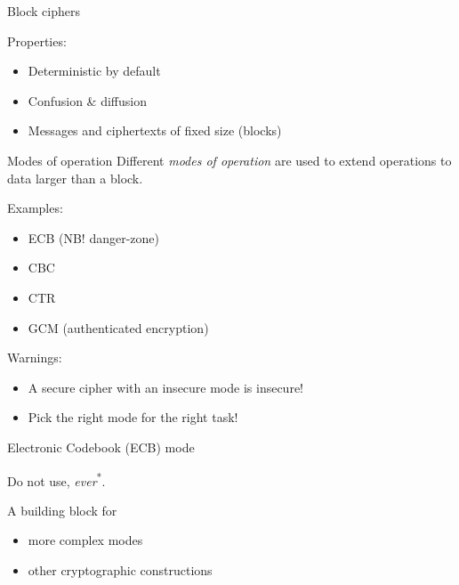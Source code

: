 \begin{frame}{Block ciphers}
\begin{center}
  \end{center}

  \pause
  Properties:
  \begin{itemize}[<+->]
    \item Deterministic by default
    \item Confusion \& diffusion
    \item Messages and ciphertexts of fixed size (blocks)
  \end{itemize}
\end{frame}

\begin{frame}{Modes of operation}
  Different \emph{modes of operation} are used to extend operations to data larger than a block.

  \pause
  Examples:
  \begin{itemize}[<+->]
    \item ECB (NB! danger-zone)
    \item CBC
    \item CTR
    \item GCM (authenticated encryption)
  \end{itemize}

  \pause
  Warnings:
  \begin{itemize}[<+->]
    \item A secure cipher with an insecure mode is insecure!
    \item Pick the right mode for the right task!
  \end{itemize}  
\end{frame}

\begin{frame}{Electronic Codebook (ECB) mode}
  \begin{center}
  \end{center}

  \pause
  Do not use, \emph{ever}\textsuperscript{*}.

  \pause
  A building block for
  \begin{itemize}[<+->]
    \item more complex modes
    \item other cryptographic constructions
  \end{itemize}
\end{frame}

